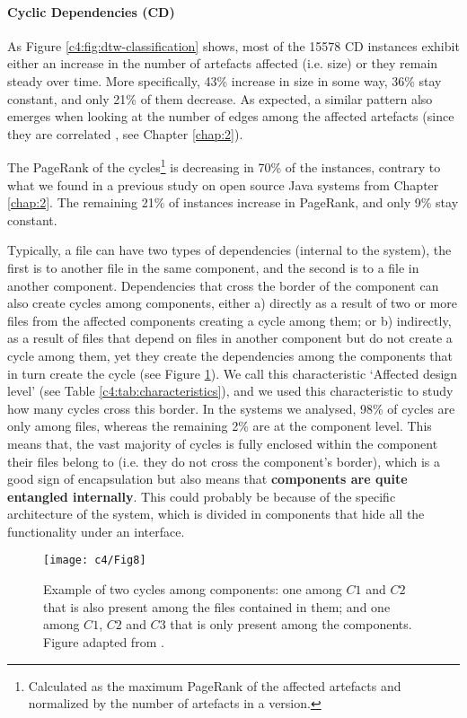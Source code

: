 \paragraph{Cyclic Dependencies (CD)} As Figure \ref{c4:fig:dtw-classification} shows, most of the 15578 CD instances exhibit either an increase in the number of artefacts affected (i.e. size) or they remain steady over time. More specifically, 43\% increase in size in some way, 36\% stay constant, and only 21\% of them decrease. As expected, a similar pattern also emerges when looking at the number of edges among the affected artefacts (since they are correlated , see Chapter \ref{chap:2}).

The PageRank of the cycles\footnote{Calculated as the maximum PageRank of the affected artefacts and normalized by the number of artefacts in a version.} is decreasing in 70\% of the instances, contrary to what we found in a previous study on open source Java systems from Chapter \ref{chap:2}.
The remaining 21\% of instances increase in PageRank, and only 9\% stay constant.

Typically, a file can have two types of dependencies (internal to the system), the first is to another file in the same component, and the second is to a file in another component.
Dependencies that cross the border of the component can also create cycles among components, either a) directly as a result of two or more files from the affected components creating a cycle among them; or b) indirectly, as a result of files that depend on files in another component but do not create a cycle among them, yet they create the dependencies among the components that in turn create the cycle (see Figure \ref{c4:fig:package-cycles}). We call this characteristic `Affected design level' (see Table \ref{c4:tab:characteristics}), and we used this characteristic to study how many cycles cross this border.
In the systems we analysed, 98\% of cycles are only among files, whereas the remaining 2\% are at the component level.
This means that, the vast majority of cycles is fully enclosed within the component their files belong to (i.e. they do not cross the component's border), which is a good sign of encapsulation but also means that \textbf{components are quite entangled internally}.
This could probably be because of the specific architecture of the system, which is divided in components that hide all the functionality under an interface.

\begin{figure}
    \centering
    \texttt{[image: c4/Fig8]}
    \caption{Example of two cycles among components: one among $C1$ and $C2$ that is also present among the files contained in them; and one among $C1$, $C2$ and $C3$ that is only present among the components. Figure adapted from \cite{AlMutawa2014}.}
    \label{c4:fig:package-cycles}
\end{figure}

